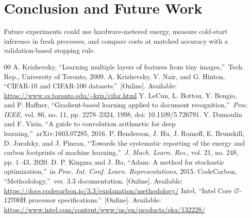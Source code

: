 \documentclass[conference]{IEEEtran}
\begin{document}
\newpage
\section{Conclusion and Future Work}
\ConclusionResults{} Future experiments could use hardware-metered energy, measure cold-start inference in fresh processes, and compare costs at matched accuracy with a validation-based stopping rule.

\begin{thebibliography}{00}
 A. Krizhevsky, \textquotedblleft Learning multiple layers of features from tiny images,\textquotedblright\ Tech. Rep., University of Toronto, 2009.
 A. Krizhevsky, V. Nair, and G. Hinton, \textquotedblleft CIFAR-10 and CIFAR-100 datasets.\textquotedblright\ [Online]. Available: \url{https://www.cs.toronto.edu/~kriz/cifar.html}
 Y. LeCun, L. Bottou, Y. Bengio, and P. Haffner, \textquotedblleft Gradient-based learning applied to document recognition,\textquotedblright\ \emph{Proc. IEEE}, vol. 86, no. 11, pp. 2278--2324, 1998, doi: 10.1109/5.726791.
 V. Dumoulin and F. Visin, \textquotedblleft A guide to convolution arithmetic for deep learning,\textquotedblright\ arXiv:1603.07285, 2016.
 P. Henderson, J. Hu, J. Romoff, E. Brunskill, D. Jurafsky, and J. Pineau, \textquotedblleft Towards the systematic reporting of the energy and carbon footprints of machine learning,\textquotedblright\ \emph{J. Mach. Learn. Res.}, vol. 21, no. 248, pp. 1--43, 2020.
 D. P. Kingma and J. Ba, \textquotedblleft Adam: A method for stochastic optimization,\textquotedblright\ in \emph{Proc. Int. Conf. Learn. Representations}, 2015.
 CodeCarbon, \textquotedblleft Methodology,\textquotedblright\ ver. 3.3 documentation. [Online]. Available: \url{https://docs.codecarbon.io/3.3/explanation/methodology/}
 Intel, \textquotedblleft Intel Core i7-12700H processor specifications.\textquotedblright\ [Online]. Available: \url{https://www.intel.com/content/www/us/en/products/sku/132228/}
\end{thebibliography}
\end{document}
